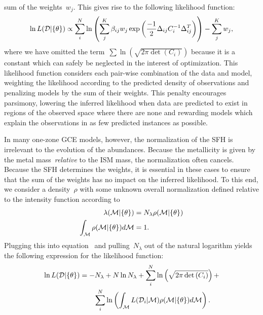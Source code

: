 \documentclass[ms.tex]{subfiles}
\begin{document}
sum of the weights~$w_j$.
This gives rise to the following likelihood function:
\begin{equation}
\ln L(\mathcal{D} | \{\theta\}) \propto
\sum_i^N \ln \left(\sum_j^K
\beta_{ij} w_j \exp\left(\frac{-1}{2}\Delta_{ij} C_i^{-1} \Delta_{ij}^T\right)
\right) - \sum_j^K w_j,
\label{eq:lnL_minus_weights}
\end{equation}
where we have omitted the term~$\sum \ln \left(\sqrt{2\pi \det{(C_i)}}\right)$
because it is a constant which can safely be neglected in the interest of
optimization.
This likelihood function considers each pair-wise combination of the data and
model, weighting the likelihood according to the predicted density of
observations and penalizing models by the sum of their weights.
This penalty encourages parsimony, lowering the inferred likelihood when data
are predicted to exist in regions of the observed space where there are none
and rewarding models which explain the observations in as few predicted
instances as possible.
\par
In many one-zone GCE models, however, the normalization of the SFH is
irrelevant to the evolution of the abundances.
Because the metallicity is given by the metal mass~\textit{relative} to the ISM
mass, the normalization often cancels.
Because the SFH determines the weights, it is essential in these cases to
ensure that the sum of the weights has no impact on the inferred likelihood.
To this end, we consider a density~$\rho$ with some unknown overall
normalization defined relative to the intensity function according to
\begin{subequations}\begin{align}
\lambda(\mathcal{M} | \{\theta\}) &= N_\lambda \rho(\mathcal{M} | \{\theta\})
\\
\int_{\mathcal{M}} \rho(\mathcal{M} | \{\theta\}) d\mathcal{M} &= 1.
\end{align}\end{subequations}
Plugging this into equation~ and pulling~$N_\lambda$
out of the natural logarithm yields the following expression for the likelihood
function:
\begin{equation}\begin{split}
\ln L(\mathcal{D} | \{\theta\}) &= -N_\lambda + N \ln N_\lambda +
\sum_i^N \ln \left(\sqrt{2\pi \det{(C_i)}}\right) +
\\
&\qquad \sum_i^N \ln \left(
\int_{\mathcal{M}} L(\mathcal{D}_i | \mathcal{M}) \rho(\mathcal{M} | \{\theta\})
d\mathcal{M} \right).
\end{split}\end{equation}
\end{document}
